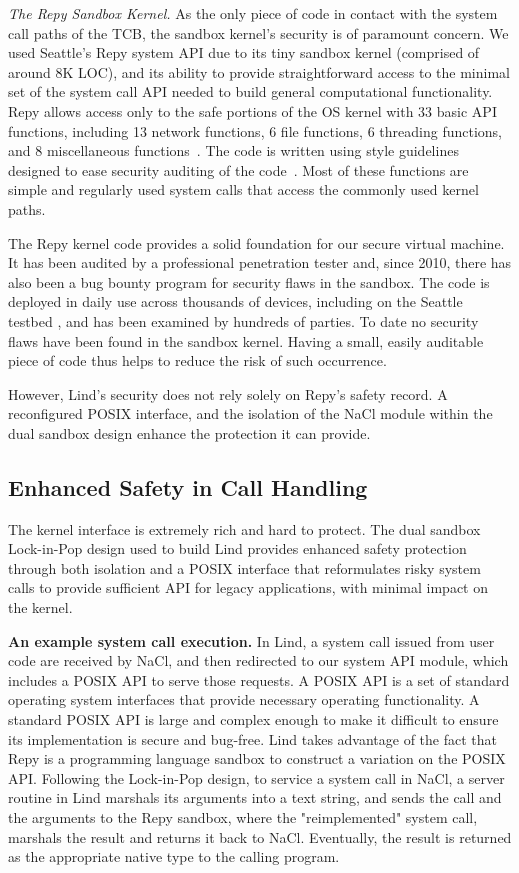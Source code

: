 \textit{The Repy Sandbox Kernel.}
As the only piece of code in contact with the system call paths of the TCB,
the sandbox kernel's security is of paramount concern.
We used Seattle's Repy system API due to its tiny sandbox kernel
(comprised of around 8K LOC), and its ability to provide straightforward
access to the minimal set of the system call API needed to build general
computational functionality. Repy allows
access only to the safe portions of the OS kernel with 33 basic API
functions, including 13 network functions, 6 file functions, 6 threading functions,
and 8 miscellaneous functions~\cite{Repy-10, RepyKernel}. The code is
written using style guidelines designed to ease security auditing
 of the code~\cite{style}. Most of these functions are simple and
regularly used system calls that access the commonly used kernel paths.

The Repy kernel code provides a solid foundation for our secure virtual
machine. It has been audited by a professional penetration tester and, since 2010,
there has also been a bug bounty program for security flaws in the sandbox.
The code is deployed in daily use across thousands of devices,
including on the Seattle testbed \cite{seattle}, and has been examined by
hundreds of parties. To date no security flaws have been found in the sandbox
kernel. Having a small, easily auditable piece of code thus helps to reduce the
risk of such occurrence.

However, Lind's security does not rely solely on Repy's
safety record. A reconfigured POSIX interface, and the isolation of
the NaCl module within the dual sandbox design enhance the protection it can
provide.

\subsection{Enhanced Safety in Call Handling}

The kernel interface is extremely rich and hard to protect.
The dual sandbox Lock-in-Pop design used to build Lind provides enhanced
safety protection through both isolation and a POSIX interface that
reformulates risky system calls to
provide sufficient API for legacy applications, with minimal impact on the kernel.

\textbf{An example system call execution.}
In Lind, a system call issued from user code are
received by NaCl, and then redirected to our system API module, which
includes a POSIX API to serve those requests. A POSIX API is a set of standard
operating system interfaces that provide
necessary operating functionality. A standard POSIX API is large and complex
enough to make it difficult to ensure its implementation is secure and bug-free.
Lind takes advantage of the fact that Repy is a programming language sandbox to
construct a variation on the POSIX API. Following the
Lock-in-Pop design, to service a system call in NaCl, a server routine in
Lind marshals its arguments into a text string, and sends the call and the arguments
to the Repy sandbox, where the "reimplemented" system call, marshals the result and
returns it back to NaCl. Eventually, the result is returned as the appropriate
native type to the calling program.

